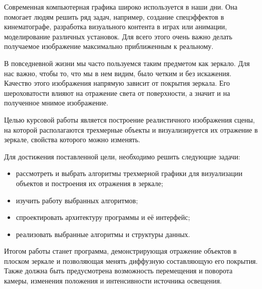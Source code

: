 
Современная компьютерная графика широко используется в наши дни. Она помогает людям решить ряд задач, например, создание спецэффектов в кинематографе, разработка визуального контента в играх или анимации, моделирование различных установок. Для всего этого очень важно делать получаемое изображение максимально приближенным к реальному.

В повседневной жизни мы часто пользуемся таким предметом как зеркало. Для нас важно, чтобы то, что мы в нем видим, было четким и без искажения. Качество этого изображения напрямую зависит от покрытия зеркала. Его шероховатости влияют на отражение света от поверхности, а значит и на полученное мнимое изображение.

Целью курсовой работы является построение реалистичного изображения сцены, на которой располагаются трехмерные объекты и визуализируется их отражение в зеркале, свойства которого можно изменять.


Для достижения поставленной цели, необходимо решить следующие задачи:
\begin{itemize}
	\item рассмотреть и выбрать алгоритмы трехмерной графики для визуализации объектов и построения их отражения в зеркале;
	\item изучить работу выбранных алгоритмов;
	\item спроектировать архитектуру программы и её интерфейс;
	\item реализовать выбранные алгоритмы и структуры данных.
\end{itemize}

Итогом работы станет программа, демонстрирующая отражение объектов в плоском зеркале и позволяющая менять диффузную составляющую его покрытия. Также должна быть предусмотрена возможность перемещения и поворота камеры, изменения положения и интенсивности источника освещения.